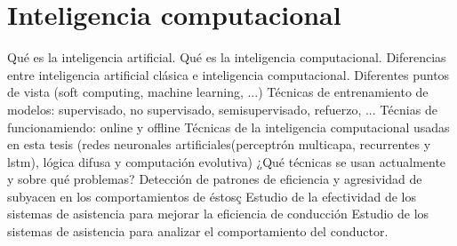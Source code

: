 \section{Inteligencia computacional}

Qué es la inteligencia artificial. Qué es la inteligencia computacional.
Diferencias entre inteligencia artificial clásica e inteligencia computacional. Diferentes puntos de vista (soft computing, machine learning, ...)
Técnicas de entrenamiento de modelos: supervisado, no supervisado, semisupervisado, refuerzo, ...
Técnias de funcionamiendo: online y offline
Técnicas de la inteligencia computacional usadas en esta tesis (redes neuronales artificiales(perceptrón multicapa, recurrentes y lstm), lógica difusa y computación evolutiva)
¿Qué técnicas se usan actualmente y sobre qué problemas?
Detección de patrones de eficiencia y agresividad de subyacen en los comportamientos de éstosç
Estudio de la efectividad de los sistemas de asistencia para mejorar la eficiencia de conducción
Estudio de los sistemas de asistencia para analizar el comportamiento del conductor.
